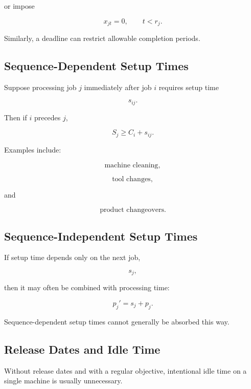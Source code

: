 or impose

\[
\boxed{
x_{jt}=0,
\qquad
t<r_j.
}
\]

Similarly, a deadline can restrict allowable completion periods.

\subsection{Sequence-Dependent Setup Times}
\label{subsec:sequence-dependent-setup-times}

Suppose processing job \(j\) immediately after job \(i\) requires setup
time

\[
\boxed{
s_{ij}.
}
\]

Then if \(i\) precedes \(j\),

\[
\boxed{
S_j
\geq
C_i+s_{ij}.
}
\]

Examples include:

\[
\boxed{
\text{machine cleaning},
}
\]

\[
\boxed{
\text{tool changes},
}
\]

and

\[
\boxed{
\text{product changeovers}.
}
\]

\subsection{Sequence-Independent Setup Times}
\label{subsec:sequence-independent-setup-times}

If setup time depends only on the next job,

\[
s_j,
\]

then it may often be combined with processing time:

\[
\boxed{
p_j'
=
s_j+p_j.
}
\]

Sequence-dependent setup times cannot generally be absorbed this way.

\subsection{Release Dates and Idle Time}
\label{subsec:release-dates-idle-time}

Without release dates and with a regular objective, intentional idle time
on a single machine is usually unnecessary.

